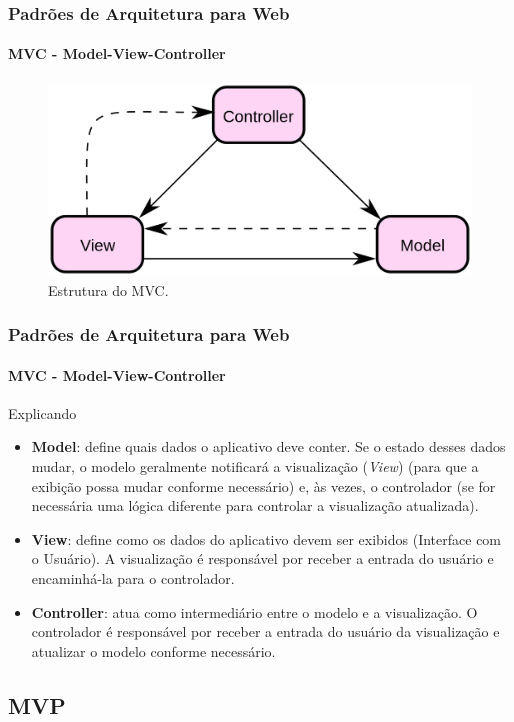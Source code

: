 \documentclass[
	9pt, %
	t, %
]{beamer}
\begin{document}
\begin{frame}
	\frametitle{Padrões de Arquitetura para Web}
	\framesubtitle{MVC - Model-View-Controller}

	\begin{figure}
		\centering
		\includegraphics[width=0.9\linewidth]{Images/mvc.png}
		\caption{Estrutura do MVC.}\label{fig:mvc}
	\end{figure}

\end{frame}

\begin{frame}
	\frametitle{Padrões de Arquitetura para Web}
	\framesubtitle{MVC - Model-View-Controller}

	\begin{block}{Explicando}
		\begin{itemize}
			\item \textbf{Model}: define quais dados o aplicativo deve conter. Se o estado desses dados mudar, o modelo geralmente notificará a visualização (\textit{View}) (para que a exibição possa mudar conforme necessário) e, às vezes, o controlador (se for necessária uma lógica diferente para controlar a visualização atualizada).
			\item \textbf{View}: define como os dados do aplicativo devem ser exibidos (Interface com o Usuário). A visualização é responsável por receber a entrada do usuário e encaminhá-la para o controlador.
			\item \textbf{Controller}: atua como intermediário entre o modelo e a visualização. O controlador é responsável por receber a entrada do usuário da visualização e atualizar o modelo conforme necessário. 
		\end{itemize}
	\end{block}

\end{frame}



\subsection{MVP}
\end{document}
